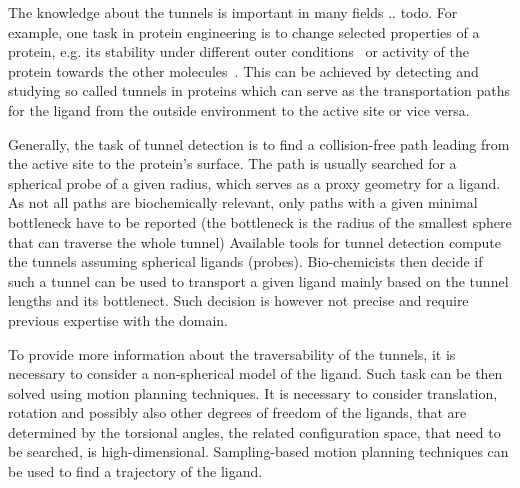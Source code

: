 \documentclass{svmult}
\begin{document}
The knowledge about the tunnels is important in many fields .. todo.
For example, one task in protein engineering is to change selected properties of a protein, e.g. its stability under different outer conditions~\cite{Koudelakova2013} or activity of the protein towards the other molecules~\cite{Pavlova2009}.
This can be achieved by detecting and studying so called tunnels in proteins which can serve as the transportation paths for the 
ligand from the outside environment to the active site or vice versa. 


Generally, the task of tunnel detection is to find a collision-free path leading from the active site to the protein's surface. 
The path is usually searched for a spherical probe of a given radius, which serves as a proxy geometry for a ligand. 
As not all paths are biochemically relevant, only paths with a given minimal bottleneck have to be reported (the bottleneck is
the radius of the smallest sphere that can traverse the whole tunnel) 
Available tools for tunnel detection compute the tunnels assuming spherical ligands (probes). 
Bio-chemicists then decide if such a tunnel can be used to transport a given ligand mainly based on the tunnel lengths and its bottlenect.
Such decision is however not precise and require previous expertise with the domain.

To provide more information about the traversability of the tunnels, it is necessary to consider a non-spherical model of the ligand.
Such task can be then solved using motion planning techniques.
It is necessary to consider translation, rotation and possibly also other degrees of freedom of the ligands, that are determined
by the torsional angles, the related configuration space, that need to be searched, is high-dimensional. 
Sampling-based motion planning techniques can be used to find a trajectory of the ligand.

\end{document}
